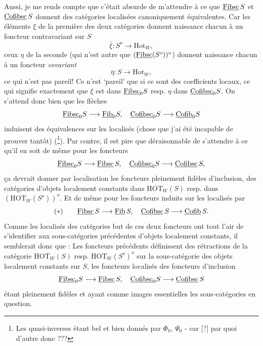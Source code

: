 Aussi, je me rends compte que c'était absurde de m'attendre à ce que $\underline{\mathrm{Fibsc}}\, S$ et $\underline{\mathrm{Cofibsc}}\, S$ donnent des catégories localisées canoniquement équivalentes. Car les éléments $\xi$ de la première
des deux catégories donnent naissance chacun à un foncteur contravariant sur $S$
\[
\bar{\xi} : S^o \longrightarrow \mathrm{Hot}_W,
\]
ceux $\eta$ de la seconde (qui n'est autre que $(\underline{\mathrm{Fibsc}}(S^o))^o$) donnent naissance chacun à un foncteur \textit{covariant}
\[
\bar{\eta} : S \longrightarrow \mathrm{Hot}_W,
\]
ce qui n'est pas pareil! Ce n'est `pareil' que si ce sont des coefficients locaux, ce qui signifie exactement que $\xi$ est dans $\underline{\mathrm{Fibsc}}_0 S$ resp. $\eta$ dans $\underline{\mathrm{Cofibsc}}_0 S$. On s'attend donc bien  que les flèches
\[
\underline{\mathrm{Fibsc}}_0 S \longrightarrow \underline{\mathrm{Fib}}_0 S, \quad \underline{\mathrm{Cofibsc}}_0 S \longrightarrow \underline{\mathrm{Cofib}}_0 S
\]
induisent des équivalences sur les localisés (chose que j'ai été incapable de prouver tantôt) (\setcounter{footnote}{15}\footnote{Les quasi-inverses étant bel et bien donnés par $\Phi_0$, $\Psi_0$ - car [?] par quoi d'autre donc ???}). Par contre, il est pire que déraisonnable de s'attendre à ce qu'il en soit de même pour les foncteurs
\[
\underline{\mathrm{Fibsc}}_0 S \longrightarrow \underline{\mathrm{Fibsc}}\, S, \quad \underline{\mathrm{Cofibsc}}_0 S \longrightarrow \underline{\mathrm{Cofibsc}}\, S,
\]
ça devrait donner par localisation les foncteurs pleinement fidèles d'inclusion, des catégories d'objets localement constants dans $\mathrm{HOT}_W(S)$ resp. dans $(\mathrm{HOT}_W(S^o))^o$. Et de même pour
les foncteurs induits sur les localisés par
\[
(*) \qquad \underline{\mathrm{Fibsc}}\, S \longrightarrow \underline{\mathrm{Fib}}\, S, \quad \underline{\mathrm{Cofibsc}}\, S \longrightarrow \underline{\mathrm{Cofib}}\, S.
\]
Comme les localisés des catégories but de ces deux foncteurs ont tout l'air de s'identifier aux sous-catégories précédentes d'objets localement constants, il semblerait donc que :  Les foncteurs précédents définissent des rétractions de la catégorie $\mathrm{HOT}_W(S)$ resp. $\mathrm{HOT}_W(S^o)^o$ sur la sous-catégorie des objets localement constants sur $S$, les foncteurs localisés des foncteurs d'inclusion
\[
\underline{\mathrm{Fibsc}}_0 S \longrightarrow \underline{\mathrm{Fibsc}}\, S, \quad \underline{\mathrm{Cofibsc}}_0 S \longrightarrow \underline{\mathrm{Cofibsc}}\, S
\]
étant pleinement fidèles et ayant comme images essentielles les sous-catégories en question.

